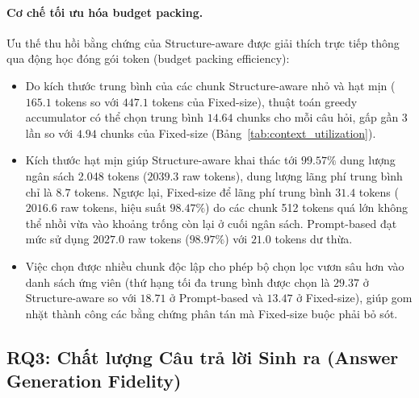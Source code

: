 \paragraph{Cơ chế tối ưu hóa budget packing.}
Ưu thế thu hồi bằng chứng của Structure-aware được giải thích trực tiếp thông qua động học đóng gói token (budget packing efficiency):
\begin{itemize}
    \item Do kích thước trung bình của các chunk Structure-aware nhỏ và hạt mịn ($165.1$ tokens so với $447.1$ tokens của Fixed-size), thuật toán greedy accumulator có thể chọn trung bình $14.64$ chunks cho mỗi câu hỏi, gấp gần 3 lần so với $4.94$ chunks của Fixed-size (Bảng~\ref{tab:context_utilization}).
    \item Kích thước hạt mịn giúp Structure-aware khai thác tới $99.57\%$ dung lượng ngân sách 2.048 tokens ($2039.3$ raw tokens), dung lượng lãng phí trung bình chỉ là $8.7$ tokens. Ngược lại, Fixed-size để lãng phí trung bình $31.4$ tokens ($2016.6$ raw tokens, hiệu suất $98.47\%$) do các chunk 512 tokens quá lớn không thể nhồi vừa vào khoảng trống còn lại ở cuối ngân sách. Prompt-based đạt mức sử dụng $2027.0$ raw tokens ($98.97\%$) với $21.0$ tokens dư thừa.
    \item Việc chọn được nhiều chunk độc lập cho phép bộ chọn lọc vươn sâu hơn vào danh sách ứng viên (thứ hạng tối đa trung bình được chọn là $29.37$ ở Structure-aware so với $18.71$ ở Prompt-based và $13.47$ ở Fixed-size), giúp gom nhặt thành công các bằng chứng phân tán mà Fixed-size buộc phải bỏ sót.
\end{itemize}

\begin{table}[t]
\centering
\small
{}
\caption{Đặc tính ngữ cảnh trung bình mỗi câu hỏi dưới retrieval token budget 2.048 tokens.}
\label{tab:context_utilization}
\end{table}

\subsection{RQ3: Chất lượng Câu trả lời Sinh ra (Answer Generation Fidelity)}
\label{subsec:rq3_generation}

